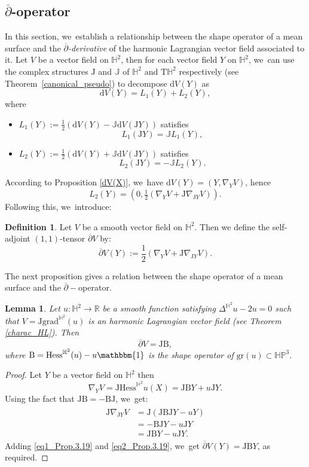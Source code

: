 \documentclass[10pt]{amsart}
\theoremstyle{plain}
\newtheorem{lemma}[cor]{Lemma}
\theoremstyle{definition}
\newtheorem{defi}[cor]{Definition}
\newcommand{\HP}{\mathbb{HP}^3}
\newcommand{\grad}{\mathrm{grad}^{\mathbb{H}^2}}
\newcommand{\hess}{\mathrm{Hess}^{\mathbb{H}^2}}
\newcommand{\J}{\mathrm{J}}
\newcommand{\B}{\mathrm{B}}
\begin{document}
\subsection{\texorpdfstring{$\overline{\partial}$-operator}{dbar-operator}}\label{Sec_dbar_operator}
In this section, we~establish a relationship between the shape operator of a mean surface and the \emph{$\overline{\partial}$-derivative} of the harmonic Lagrangian vector field associated to it. Let $V$ be a vector field on $\mathbb{H}^2$, then for each vector field $Y$ on $\mathbb{H}^2$, we~can use the complex structures $\J$ and $\mathbb{J}$ of $\mathbb{H}^2$ and $\mathrm{T}\mathbb{H}^2$ respectively (see Theorem~\ref{canonical_pseudo}) to decompose $\mathrm{d}V(Y)$ as
\[
\mathrm{d}V(Y)=L_1(Y)+L_2(Y),
\]
where \begin{itemize}
\item $L_1(Y):=\frac{1}{2}(\mathrm{d}V(Y)-\mathbb{J}\mathrm{d}V(\J Y))$ satisfies
\[
L_1(\J Y)=\mathbb{J}L_1(Y),
\]
\item $L_2(Y):=\frac{1}{2}(\mathrm{d}V(Y)+\mathbb{J}\mathrm{d}V(\J Y))$ satisfies
\[
L_2(\J Y)=-\mathbb{J}L_2(Y).
\]
\end{itemize}
According to Proposition \ref{dV(X)}, we~have $\mathrm{d}V(Y)=(Y,\nabla_YV)$, hence
\[
L_2(Y)=(0,\tfrac{1}{2}(\nabla_YV+\J\nabla_{\J Y}V)).
\]
Following this, we~introduce:
\begin{defi}
Let $V$ be a smooth vector field on $\mathbb{H}^2$. Then we define the self-adjoint $(1,1)$-tensor $\overline{\partial}V$ by:
\begin{equation}\label{dbar_H2}
\overline{\partial}V(Y):=\frac{1}{2}(\nabla_YV+\J\nabla_{\J Y}V).
\end{equation}
\end{defi}
The next proposition gives a relation between the shape operator of a mean surface and the $\overline{\partial}-$operator.
\begin{lemma}\label{d_bar_and_shape_operator}
Let $u:\mathbb{H}^2\to\mathbb{R}$ be a smooth function satisfying $\Delta^{\mathbb{H}^2} u-2u=0$ such that $V=\J\grad(u)$ is an harmonic Lagrangian vector field (see Theorem
\ref{charac_HL}). Then
\[
\overline{\partial}V=\J\B,
\]
where $\B=\hess(u)-u\mathbbm{1}$ is the shape operator of $\mathrm{gr}(u)\subset\HP$.
\end{lemma}
\begin{proof}
Let $Y$ be a vector field on $\mathbb{H}^2$ then
\begin{equation}\label{eq1_Prop.3.19}
\nabla_YV=\J\hess u(X)=\J\B Y+u\J Y.
\end{equation}
Using the fact that $\J \B=-\B\J$, we~get:
\begin{align}\label{eq2_Prop.3.19}
\begin{split}
\J\nabla_{\J Y}V&=\J(\J \B \J Y-uY)\\
&=-\B \J Y-u\J Y\\
&=\J \B Y-u\J Y.
\end{split}
\end{align}
Adding \eqref{eq1_Prop.3.19} and \eqref{eq2_Prop.3.19}, we~get $ \overline{\partial}V(Y)=\J \B Y$, as required. \end{proof}
\end{document}
